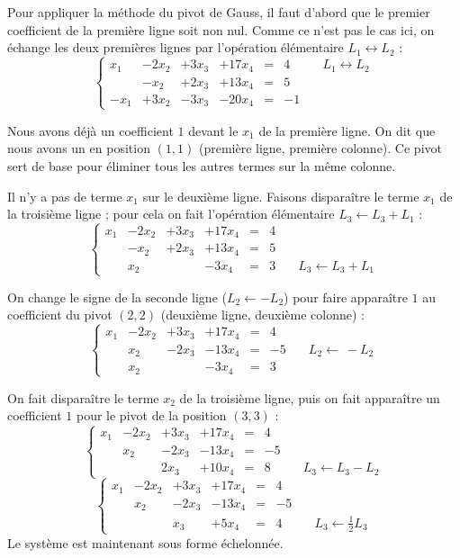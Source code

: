 \documentclass[class=report,crop=false]{standalone}
\begin{document}
Pour appliquer la méthode du pivot de Gauss, il faut
d'abord que le premier coefficient de la première ligne soit non nul.
Comme ce n'est pas le cas ici, on échange les deux premières lignes par l'opération élémentaire
$L_1 \leftrightarrow L_2$ :
\[\left\{\begin{array}{ccccccr}
x_1 &-2x_2&+3x_3& +17x_4 &=& 4 & {\scriptstyle \quad L_1 \leftrightarrow L_2} \\
    & -x_2 &+2x_3& +13x_4 &=& 5  &  \\
-x_1& +3x_2    &-3x_3  & -20x_4  &=& -1 &
\end{array} \right.\]

Nous avons déjà un coefficient $1$ devant le $x_1$ de la première ligne.
On dit que nous avons un  en position $(1,1)$ (première ligne, première colonne).
Ce pivot sert de base pour éliminer tous les autres termes sur la même colonne.

Il n'y a pas de terme $x_1$ sur le deuxième ligne.
Faisons disparaître le terme $x_1$ de la troisième ligne ;
pour cela on fait l'opération élémentaire $L_3 \leftarrow L_3+L_1$ :
\[\left\{\begin{array}{ccccccr}
x_1 &-2x_2&+3x_3& +17x_4 &=& 4 & \\
    & -x_2 &+2x_3& +13x_4 &=& 5  &  \\
    & x_2    &  & -3x_4  &=& 3 & {\scriptstyle \quad L_3 \leftarrow L_3+L_1}
\end{array} \right.\]
\qquad

On change le signe de la seconde ligne ($L_2 \leftarrow -L_2$) pour faire apparaître
$1$ au coefficient du pivot $(2,2)$ (deuxième ligne, deuxième colonne) :
\[
\left\{\begin{array}{ccccccr}
x_1 &-2x_2&+3x_3& +17x_4 &=& 4 & \\
    & x_2 &-2x_3& -13x_4 &=& -5  &  {\scriptstyle \quad L_2 \leftarrow \ -L_2}\\
    & x_2    &  & -3x_4  &=& 3 &
\end{array} \right.
 \]


 On fait disparaître le terme $x_2$ de la troisième ligne,
 puis on fait apparaître un coefficient $1$ pour le pivot de la position $(3,3)$ :
\[
\left\{\begin{array}{ccccccr}
x_1 &-2x_2&+3x_3& +17x_4 &=& 4 & \\
    & x_2 &-2x_3& -13x_4 &=& -5  & \\
    &     & 2x_3 & +10x_4  &=& 8 & {\scriptstyle \quad L_3 \leftarrow L_3 -L_2}
\end{array} \right.
\]\[
\left\{\begin{array}{ccccccr}
x_1 &-2x_2&+3x_3& +17x_4 &=& 4 & \\
    & x_2 &-2x_3& -13x_4 &=& -5  & \\
    &     & x_3 & +5x_4  &=& 4  & {\scriptstyle \quad L_3 \leftarrow \frac12 L_3}
\end{array} \right. \]
Le système est maintenant sous forme échelonnée.
\end{document}
